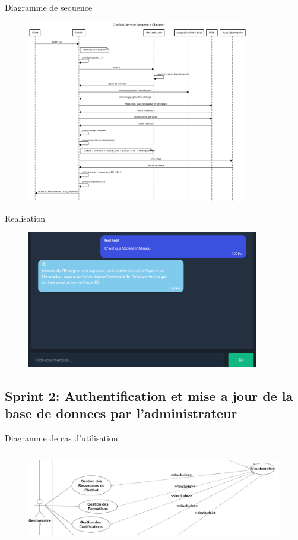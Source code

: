 \documentclass[aspectratio=169]{beamer}
\begin{document}
\begin{frame}{Diagramme de sequence}
    \begin{figure}[htpb]
        \centering
        \includegraphics[height=8cm]{pic/chatbot-seq.png}
    \end{figure}
\end{frame}

\begin{frame}{Realisation}
    \begin{figure}[htpb]
        \centering
        \includegraphics[height=6cm]{pic/chat2.png}
    \end{figure}
\end{frame}


\subsection{Sprint 2: Authentification et mise a jour de la
    base de donnees par l’administrateur}
\begin{frame}{Diagramme de cas d'utilisation}

    \begin{figure}[htpb]
        \centering
        \includegraphics[height=4cm]{pic/sprint2-usecase.png}
    \end{figure}
\end{frame}
\end{document}
